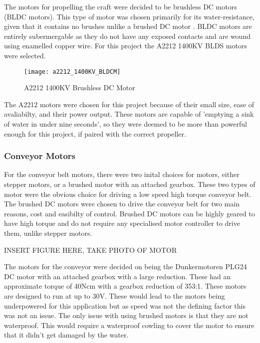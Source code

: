 \documentclass [11pt]{article}
\begin{document}
The motors for propelling the craft were decided to be brushless DC motors (BLDC motors). This type of motor was chosen primarily for its water-resistance, given that it contains no brushes unlike a brushed DC motor \cite{brushed_vs_brushless}. BLDC motors are entirely subermergable as they do not have any exposed contacts and are wound using enamelled copper wire. For this project the A2212 1400KV BLDS motors were selected. 

\begin{figure}[H]
\centerline{\texttt{[image: a2212\_1400KV\_BLDCM]}}
\caption{A2212 1400KV Brushless DC Motor}
\label{fig:a2212_1400KV_BLDCM}
\end{figure}

The A2212 motors were chosen for this project because of their small size, ease of avaliabilty, and their power output. These motors are capable of 'emptying a sink of water in under nine seconds', so they were deemed to be more than powerful enough for this project, if paired with the correct propeller. 

\subsubsection{Conveyor Motors}

For the conveyor belt motors, there were two inital choices for motors, either stepper motors, or a brushed motor with an attached gearbox. These two types of motor were the obvious choice for driving a low speed high torque conveyor belt. The brushed DC motors were chosen to drive the conveyor belt for two main reasons, cost and easibilty of control. Brushed DC motors can be highly geared to have high torque and do not require any specialised motor controller to drive them, unlike stepper motors.

INSERT FIGURE HERE, TAKE PHOTO OF MOTOR

The motors for the conveyor were decided on being  the Dunkermotoren PLG24 DC motor with an attached gearbox with a large reduction. These had an approximate torque of 40Ncm with a gearbox reduction of 353:1. These motors are designed to run at up to 30V. These would lead to the motors being underpowered for this application but as speed was not the defining factor this was not an issue. The only issue with using brushed motors is that they are not waterproof. This would require a waterproof cowling to cover the motor to ensure that it didn't get damaged by the water. 
\end{document}
